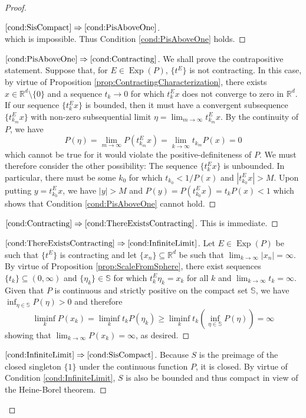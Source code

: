 \documentclass[11pt]{article}
\newcommand*{\myproofname}{Proof}
\newenvironment{subproof}[1][\myproofname]{\begin{proof}[#1]\renewcommand*{\qedsymbol}{$\mathbin{/\mkern-6mu/}$}}{\end{proof}}
\newcommand\Exp{\operatorname{Exp}}
\begin{document}
\begin{proof}
\begin{subproof}[$\ref{cond:SisCompact}\Rightarrow\ref{cond:PisAboveOne}$]
\begin{equation*}
\end{equation*}
which is impossible. Thus Condition \ref{cond:PisAboveOne} holds.
\end{subproof}
\begin{subproof}[$\ref{cond:PisAboveOne}\Rightarrow\ref{cond:Contracting}$]
We shall prove the contrapositive statement. Suppose that, for $E\in\Exp(P)$, $\{t^E\}$ is not contracting. In this case, by virtue of Proposition \ref{prop:ContractingCharacterization}, there exists $x\in\mathbb{R}^d\setminus\{0\}$ and a sequence $t_k\to 0$ for which $t_k^Ex$ does not converge to zero in $\mathbb{R}^d$. If our sequence $\{t_k^Ex\}$ is bounded, then it must have a convergent subsequence $\{t_{k_m}^Ex\}$ with non-zero subsequential limit $\eta=\lim_{m\to\infty}t_{k_m}^Ex$. By the continuity of $P$, we have
\begin{equation*}
P(\eta)=\lim_{m\to\infty}P(t_{k_m}^Ex)=\lim_{k\to\infty}t_{k_m}P(x)=0
\end{equation*}
which cannot be true for it would violate the positive-definiteness of $P$. We must therefore consider the other possibility: The sequence $\{t_k^Ex\}$ is unbounded. In particular, there must be some $k_0$ for which $t_{k_0}<1/P(x)$ and $|t_{k_0}^Ex|>M$. Upon putting $y=t_{k_0}^Ex$, we have $|y|>M$ and  $P(y)=P(t_{k_0}^Ex)=t_kP(x)<1$ which shows that Condition \ref{cond:PisAboveOne} cannot hold.
\end{subproof}
\begin{subproof}[$\ref{cond:Contracting}\Rightarrow\ref{cond:ThereExistsContracting}$] This is immediate.
\end{subproof}
\begin{subproof}[$\ref{cond:ThereExistsContracting}\Rightarrow\ref{cond:InfiniteLimit}$]
Let $E\in\Exp(P)$ be such that $\{t^E\}$ is contracting and let $\{x_n\}\subseteq\mathbb{R}^d$ be such that $\lim_{k\to\infty}|x_n|=\infty$. By virtue of Proposition \ref{prop:ScaleFromSphere}, there exist sequences $\{t_k\}\subseteq (0,\infty)$ and $\{\eta_k\}\in\mathbb{S}$ for which $t_k^E\eta_k=x_k$ for all $k$ and $\lim_{k\to\infty}t_k=\infty$. Given that $P$ is continuous and strictly positive on the compact set $\mathbb{S}$, we have $\inf_{\eta\in\mathbb{S}}P(\eta)>0$ and therefore
\begin{equation*}
\liminf_k P(x_k)=\liminf_k t_kP(\eta_k)\geq \liminf_k t_k\left(\inf_{\eta\in\mathbb{S}}P(\eta)\right)=\infty
\end{equation*}
showing that $\lim_{k\to\infty} P(x_k)=\infty$, as desired.
\end{subproof}
\begin{subproof}[$\ref{cond:InfiniteLimit}\Rightarrow\ref{cond:SisCompact}$]
Because $S$ is the preimage of the closed singleton $\{1\}$ under the continuous function $P$, it is closed. By virtue of Condition \ref{cond:InfiniteLimit}, $S$ is also be bounded and thus compact in view of the Heine-Borel theorem.
\end{subproof}
\end{proof}
\end{document}
